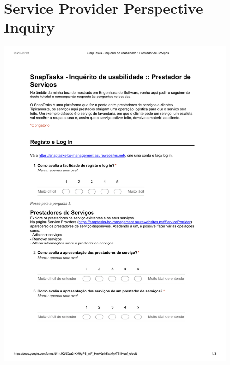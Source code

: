 \chapter{Service Provider Perspective Inquiry} %

\label{AppendixE} 

 \includegraphics[page=1,origin=c, width=0.9\textwidth ]{appendices/files/inquiry-serviceprovider.pdf}

\pagebreak


